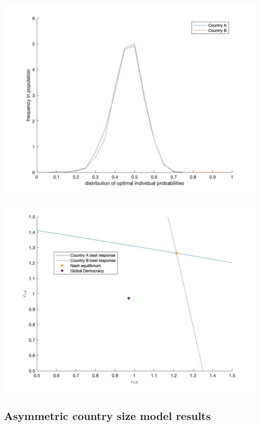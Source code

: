 \documentclass[11pt,preprint, authoryear]{elsarticle}
\let\origfigure\figure
\let\endorigfigure\endfigure
\renewenvironment{figure}[1][2] {
    \expandafter\origfigure\expandafter[H]
} {
    \endorigfigure
}
\numberwithin{equation}{section}
\numberwithin{figure}{section}
\numberwithin{table}{section}
\begin{document}
\begin{figure}[H]

{\centering \includegraphics[width=0.75\linewidth]{images/Fig4_0.5Size0Bias} 

}

\caption{Symmetric country size model: Kernel density function of the distribution of the optimal probabilty of crisis and frequency thereof across individuals in country A and country B}\label{fig:Fig 5.1}
\end{figure}

\begin{figure}[H]

{\centering \includegraphics[width=0.75\linewidth]{images/Fig2_0.5Size0Bias} 

}

\caption{Best response functions for symmetric country size model compared to global democracy}\label{fig:Fig 5.2}
\end{figure}

\hypertarget{asymmetric-country-size-model-results}{%
\subsection{Asymmetric country size model
results}\label{asymmetric-country-size-model-results}}
\end{document}
